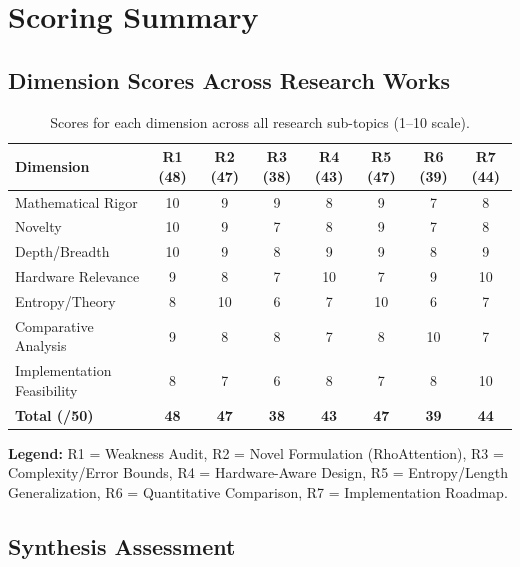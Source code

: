 \documentclass[11pt,a4paper]{article}
\theoremstyle{remark}
\begin{document}
\section{Scoring Summary}

\subsection{Dimension Scores Across Research Works}

\begin{table}[h]
\centering
\caption{Scores for each dimension across all research sub-topics (1--10 scale).}
\begin{tabular}{lccccccc}
\toprule
\textbf{Dimension} & \textbf{R1 (48)} & \textbf{R2 (47)} & \textbf{R3 (38)} & \textbf{R4 (43)} & \textbf{R5 (47)} & \textbf{R6 (39)} & \textbf{R7 (44)} \\
\midrule
Mathematical Rigor & 10 & 9 & 9 & 8 & 9 & 7 & 8 \\
Novelty & 10 & 9 & 7 & 8 & 9 & 7 & 8 \\
Depth/Breadth & 10 & 9 & 8 & 9 & 9 & 8 & 9 \\
Hardware Relevance & 9 & 8 & 7 & 10 & 7 & 9 & 10 \\
Entropy/Theory & 8 & 10 & 6 & 7 & 10 & 6 & 7 \\
Comparative Analysis & 9 & 8 & 8 & 7 & 8 & 10 & 7 \\
Implementation Feasibility & 8 & 7 & 6 & 8 & 7 & 8 & 10 \\
\midrule
\textbf{Total (/50)} & \textbf{48} & \textbf{47} & \textbf{38} & \textbf{43} & \textbf{47} & \textbf{39} & \textbf{44} \\
\bottomrule
\end{tabular}
\end{table}

\textbf{Legend:} R1 = Weakness Audit, R2 = Novel Formulation (RhoAttention), R3 = Complexity/Error Bounds, R4 = Hardware-Aware Design, R5 = Entropy/Length Generalization, R6 = Quantitative Comparison, R7 = Implementation Roadmap.

\subsection{Synthesis Assessment}
\end{document}

